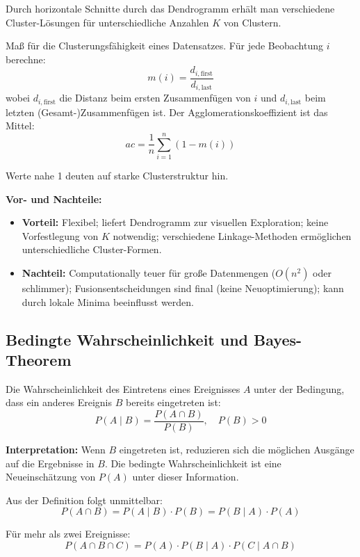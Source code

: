 Durch horizontale Schnitte durch das Dendrogramm erhält man verschiedene Cluster-Lösungen für unterschiedliche Anzahlen $K$ von Clustern.

Maß für die Clusterungsfähigkeit eines Datensatzes. Für jede Beobachtung $i$ berechne:
$$m(i) = \frac{d_{i,\text{first}}}{d_{i,\text{last}}}$$
wobei $d_{i,\text{first}}$ die Distanz beim ersten Zusammenfügen von $i$ und $d_{i,\text{last}}$ beim letzten (Gesamt-)Zusammenfügen ist. Der Agglomerationskoeffizient ist das Mittel:
$$ac = \frac{1}{n} \sum_{i=1}^{n} (1 - m(i))$$

Werte nahe 1 deuten auf starke Clusterstruktur hin.

\textbf{Vor- und Nachteile:}
\begin{itemize}[leftmargin=1.5em]
    \item \textbf{Vorteil:} Flexibel; liefert Dendrogramm zur visuellen Exploration; keine Vorfestlegung von $K$ notwendig; verschiedene Linkage-Methoden ermöglichen unterschiedliche Cluster-Formen.
    \item \textbf{Nachteil:} Computationally teuer für große Datenmengen ($O(n^2)$ oder schlimmer); Fusionsentscheidungen sind final (keine Neuoptimierung); kann durch lokale Minima beeinflusst werden.
\end{itemize}

\newpage

\subsection{Bedingte Wahrscheinlichkeit und Bayes-Theorem}

Die Wahrscheinlichkeit des Eintretens eines Ereignisses $A$ unter der Bedingung, dass ein anderes Ereignis $B$ bereits eingetreten ist:
$$P(A \mid B) = \frac{P(A \cap B)}{P(B)}, \quad P(B) > 0$$

\textbf{Interpretation:} Wenn $B$ eingetreten ist, reduzieren sich die möglichen Ausgänge auf die Ergebnisse in $B$. Die bedingte Wahrscheinlichkeit ist eine Neueinschätzung von $P(A)$ unter dieser Information.

Aus der Definition folgt unmittelbar:
$$P(A \cap B) = P(A \mid B) \cdot P(B) = P(B \mid A) \cdot P(A)$$

Für mehr als zwei Ereignisse:
$$P(A \cap B \cap C) = P(A) \cdot P(B \mid A) \cdot P(C \mid A \cap B)$$

